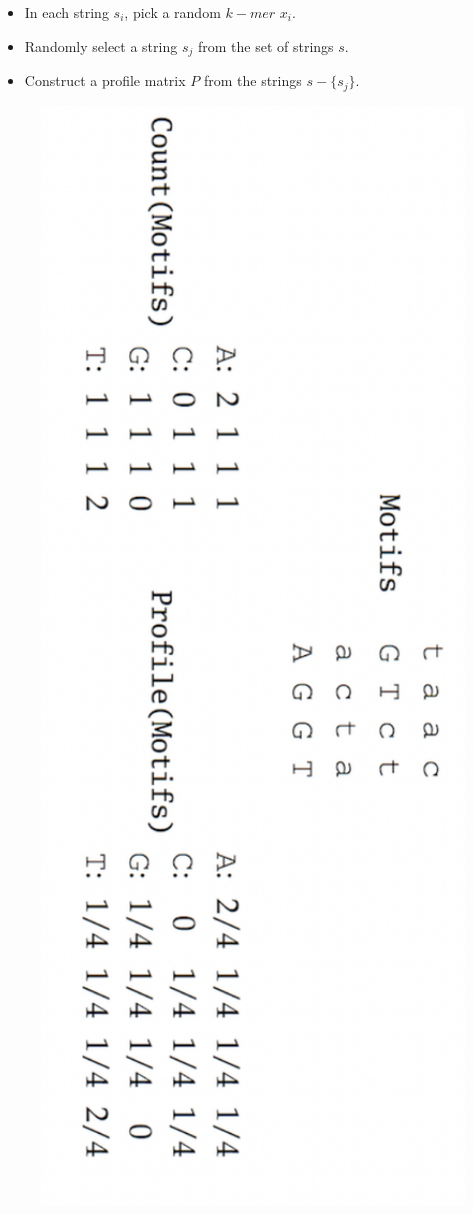 \documentclass[12pt]{scrartcl} %
\begin{document}
\begin{itemize}
    \item In each string $s_i$, pick a random $k-mer$ $x_i$.
    \item Randomly select a string $s_j$ from the set of strings $s$.
    \item Construct a profile matrix $P$ from the strings $s - \{s_j\}$.
    \begin{center}
        \includegraphics[width=0.95\textwidth]{Pictures/Profile_m.png}

\end{center}
\end{itemize}
\end{document}
